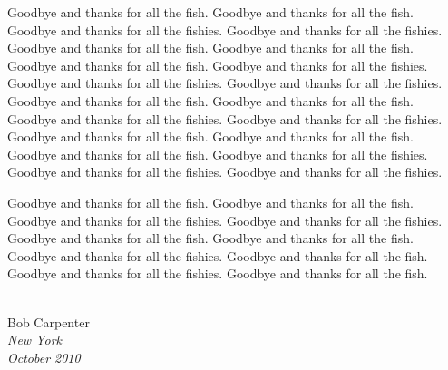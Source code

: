 Goodbye and thanks for all the fish.
Goodbye and thanks for all the fish.
Goodbye and thanks for all the fishies.
Goodbye and thanks for all the fishies.
Goodbye and thanks for all the fish.
Goodbye and thanks for all the fish.
Goodbye and thanks for all the fish.
Goodbye and thanks for all the fishies.
Goodbye and thanks for all the fishies.
Goodbye and thanks for all the fishies.
Goodbye and thanks for all the fish.
Goodbye and thanks for all the fish.
Goodbye and thanks for all the fishies.
Goodbye and thanks for all the fishies.
Goodbye and thanks for all the fish.
Goodbye and thanks for all the fish.
Goodbye and thanks for all the fish.
Goodbye and thanks for all the fishies.
Goodbye and thanks for all the fishies.
Goodbye and thanks for all the fishies.

Goodbye and thanks for all the fish.
Goodbye and thanks for all the fish.
Goodbye and thanks for all the fishies.
Goodbye and thanks for all the fishies.
Goodbye and thanks for all the fish.
Goodbye and thanks for all the fish.
Goodbye and thanks for all the fishies.
Goodbye and thanks for all the fish.
Goodbye and thanks for all the fishies.
Goodbye and thanks for all the fish.
\\[0.2in]
\newlength{\sigWidth}
\mbox{ }
\hfill
\parbox{\sigWidth}{
Bob Carpenter
\\[2pt]\small
\it New York
\\
October 2010}
